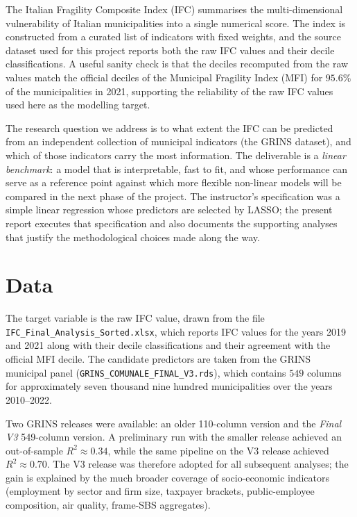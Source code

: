 \documentclass[11pt,a4paper]{article}
\begin{document}
The Italian Fragility Composite Index (IFC) summarises the
multi-dimensional vulnerability of Italian municipalities into a single
numerical score. The index is constructed from a curated list of
indicators with fixed weights, and the source dataset used for this
project reports both the raw IFC values and their decile
classifications. A useful sanity check is that the deciles recomputed
from the raw values match the official deciles of the Municipal
Fragility Index (MFI) for \(95.6\%\) of the municipalities in 2021,
supporting the reliability of the raw IFC values used here as the
modelling target.

The research question we address is to what extent the IFC can be
predicted from an independent collection of municipal indicators (the
GRINS dataset), and which of those indicators carry the most
information. The deliverable is a \emph{linear benchmark}: a model that
is interpretable, fast to fit, and whose performance can serve as a
reference point against which more flexible non-linear models will be
compared in the next phase of the project. The instructor's
specification was a simple linear regression whose predictors are
selected by LASSO; the present report executes that specification and
also documents the supporting analyses that justify the methodological
choices made along the way.

\section{Data}
\label{sec:data}

The target variable is the raw IFC value, drawn from the file
\texttt{IFC\_Final\_Analysis\_Sorted.xlsx}, which reports IFC values
for the years 2019 and 2021 along with their decile classifications and
their agreement with the official MFI decile. The candidate predictors
are taken from the GRINS municipal panel
(\texttt{GRINS\_COMUNALE\_FINAL\_V3.rds}), which contains
\(549\) columns for approximately seven thousand nine hundred
municipalities over the years 2010--2022.

Two GRINS releases were available: an older 110-column version and the
\emph{Final V3} 549-column version. A preliminary run with the smaller
release achieved an out-of-sample \(R^{2} \approx 0.34\), while the
same pipeline on the V3 release achieved \(R^{2} \approx 0.70\). The
V3 release was therefore adopted for all subsequent analyses; the gain
is explained by the much broader coverage of socio-economic
indicators (employment by sector and firm size, taxpayer brackets,
public-employee composition, air quality, frame-SBS aggregates).
\end{document}
